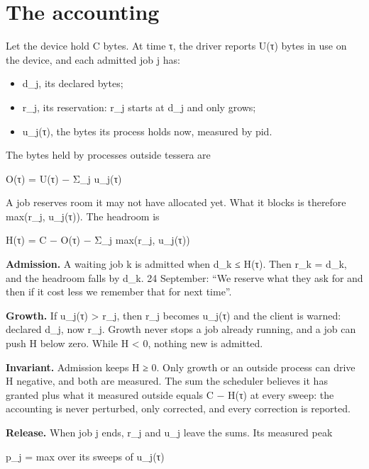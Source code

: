 \section{\texorpdfstring{The accounting}{The accounting}}

Let the device hold C bytes. At time τ, the driver reports U(τ) bytes in use on the device, and each admitted job j has:

\begin{itemize}
\item d\_\allowbreak{}j, its declared bytes;
\item r\_\allowbreak{}j, its reservation: r\_\allowbreak{}j starts at d\_\allowbreak{}j and only grows;
\item u\_\allowbreak{}j(τ), the bytes its process holds now, measured by pid.
\end{itemize}

The bytes held by processes outside tessera are

O(τ) = U(τ) − Σ\_\allowbreak{}j u\_\allowbreak{}j(τ)

A job reserves room it may not have allocated yet. What it blocks is therefore max(r\_\allowbreak{}j, u\_\allowbreak{}j(τ)). The headroom is

H(τ) = C − O(τ) − Σ\_\allowbreak{}j max(r\_\allowbreak{}j, u\_\allowbreak{}j(τ))

\textbf{Admission.} A waiting job k is admitted when d\_\allowbreak{}k ≤ H(τ). Then r\_\allowbreak{}k = d\_\allowbreak{}k, and the headroom falls by d\_\allowbreak{}k. 24 September: “We reserve what they ask for and then if it cost less we remember that for next time”.

\textbf{Growth.} If u\_\allowbreak{}j(τ) > r\_\allowbreak{}j, then r\_\allowbreak{}j becomes u\_\allowbreak{}j(τ) and the client is warned: declared d\_\allowbreak{}j, now r\_\allowbreak{}j. Growth never stops a job already running, and a job can push H below zero. While H < 0, nothing new is admitted.

\textbf{Invariant.} Admission keeps H ≥ 0. Only growth or an outside process can drive H negative, and both are measured. The sum the scheduler believes it has granted plus what it measured outside equals C − H(τ) at every sweep: the accounting is never perturbed, only corrected, and every correction is reported.

\textbf{Release.} When job j ends, r\_\allowbreak{}j and u\_\allowbreak{}j leave the sums. Its measured peak

p\_\allowbreak{}j = max over its sweeps of u\_\allowbreak{}j(τ)

